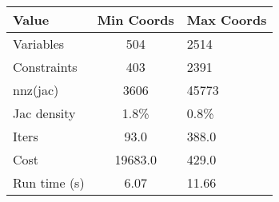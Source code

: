 \begin{tabular}{lcl}
\toprule 
Value & Min Coords & Max Coords \\
\midrule 
Variables & 504 & 2514 \\
Constraints & 403 & 2391 \\
nnz(jac) & 3606 & 45773 \\
Jac density & 1.8\% & 0.8\% \\
Iters & 93.0 & 388.0 \\
Cost & 19683.0 & 429.0 \\
Run time (s) & 6.07 & 11.66 \\
\bottomrule 
\end{tabular}
